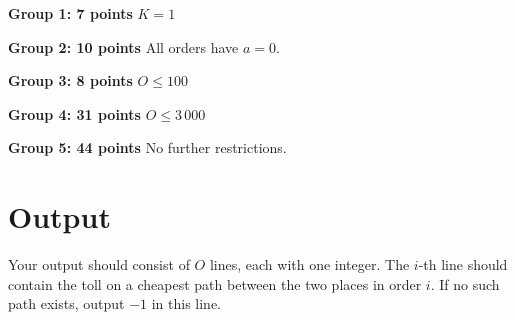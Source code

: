 \begin{description}
    \item{\textbf{Group 1: 7 points}} $K = 1$                 %
    \item{\textbf{Group 2: 10 points}} All orders have $a=0$.  %
    \item{\textbf{Group 3: 8 points}} $O \leq 100$   %
    \item{\textbf{Group 4: 31 points}} $O \leq 3\,000$         %
    \item{\textbf{Group 5: 44 points}} No further restrictions. %
\end{description}


\section*{Output}
Your output should consist of $O$ lines, each with one integer. The $i$-th line should contain the toll on a cheapest path between the two places in order $i$. If no such path exists, output $-1$ in this line.
